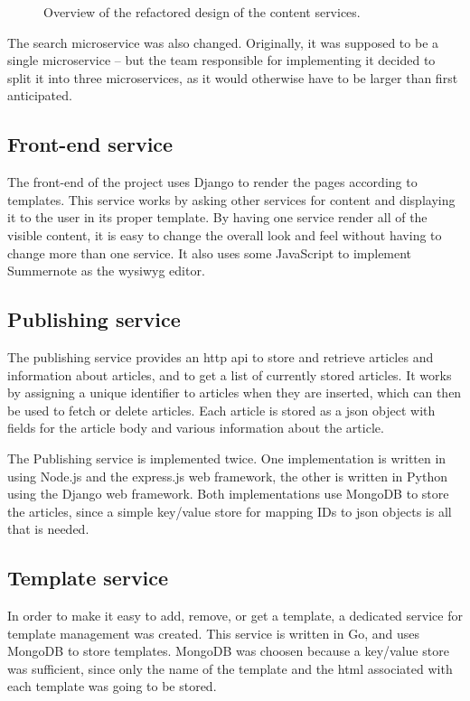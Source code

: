\begin{figure}[H]
    \centering
    \scalebox{0.8}{}
    \caption{Overview of the refactored design of the content services.}\label{fig:content_arch_new}
\end{figure}

The search microservice was also changed. Originally, it was supposed to be a single microservice -- but the team responsible for implementing it decided to split it into three microservices, as it would otherwise have to be larger than first anticipated.

\subsection{Front-end service}
The front-end of the project uses Django to render the pages according to templates. This service works by asking other services for content and displaying it to the user in its proper template. By having one service render all of the visible content, it is easy to change the overall look and feel without having to change more than one service. It also uses some JavaScript to implement Summernote as the \acrshort{wysiwyg} editor. 

\subsection{Publishing service}
The publishing service provides an \acrshort{http} \acrshort{api} to store and retrieve articles and information about articles, and to get a list of currently stored articles. It works by assigning a unique identifier to articles when they are inserted, which can then be used to fetch or delete articles. Each article is stored as a \acrshort{json} object with fields for the article body and various information about the article.

The Publishing service is implemented twice. One implementation is written in using Node.js and the express.js web framework, the other is written in Python using the Django web framework. Both implementations use MongoDB to store the articles, since a simple key/value store for mapping IDs to \acrshort{json} objects is all that is needed.

\subsection{Template service}
In order to make it easy to add, remove, or get a template, a dedicated service for template management was created.
This service is written in Go, and uses MongoDB to store templates. MongoDB was choosen because a key/value store was sufficient, since only the name of the template and the \acrshort{html} associated with each template was going to be stored.


